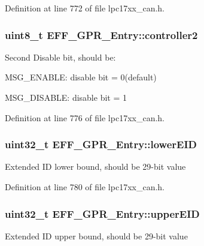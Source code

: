 \-Definition at line 772 of file lpc17xx\-\_\-can.\-h.

\hypertarget{struct_e_f_f___g_p_r___entry_a9db07b6510572b13a4149eb110f7fe12}{
\subsubsection[{controller2}]{\setlength{\rightskip}{0pt plus 5cm}uint8\-\_\-t {\bf \-E\-F\-F\-\_\-\-G\-P\-R\-\_\-\-Entry\-::controller2}}}\label{struct_e_f_f___g_p_r___entry_a9db07b6510572b13a4149eb110f7fe12}
\-Second \-Disable bit, should be\-:
\begin{DoxyItemize}
\item \-M\-S\-G\-\_\-\-E\-N\-A\-B\-L\-E\-: disable bit = 0(default)
\item \-M\-S\-G\-\_\-\-D\-I\-S\-A\-B\-L\-E\-: disable bit = 1 
\end{DoxyItemize}

\-Definition at line 776 of file lpc17xx\-\_\-can.\-h.

\hypertarget{struct_e_f_f___g_p_r___entry_aa849f69271154ced3bcdc83807078404}{
\subsubsection[{lower\-E\-I\-D}]{\setlength{\rightskip}{0pt plus 5cm}uint32\-\_\-t {\bf \-E\-F\-F\-\_\-\-G\-P\-R\-\_\-\-Entry\-::lower\-E\-I\-D}}}\label{struct_e_f_f___g_p_r___entry_aa849f69271154ced3bcdc83807078404}
\-Extended \-I\-D lower bound, should be 29-\/bit value 

\-Definition at line 780 of file lpc17xx\-\_\-can.\-h.

\hypertarget{struct_e_f_f___g_p_r___entry_a95da04e82c6e0f5528daf08398257f62}{
\subsubsection[{upper\-E\-I\-D}]{\setlength{\rightskip}{0pt plus 5cm}uint32\-\_\-t {\bf \-E\-F\-F\-\_\-\-G\-P\-R\-\_\-\-Entry\-::upper\-E\-I\-D}}}\label{struct_e_f_f___g_p_r___entry_a95da04e82c6e0f5528daf08398257f62}
\-Extended \-I\-D upper bound, should be 29-\/bit value 

